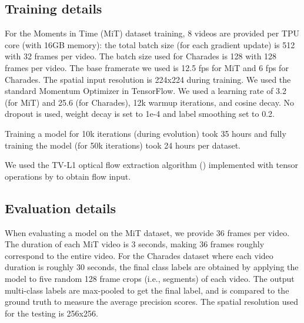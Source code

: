 \documentclass{article} \usepackage{iclr2020_conference,times}
\begin{document}
\subsection{Training details}

For the Moments in Time (MiT) dataset training, 8 videos are provided per TPU core (with 16GB memory): the total batch size (for each gradient update) is 512 with 32 frames per video. The batch size used for Charades is 128 with 128 frames per video. The base framerate we used is 12.5 fps for MiT and 6 fps for Charades. The spatial input resolution is 224x224 during training. We used the standard Momentum Optimizer in TensorFlow. We used a learning rate of 3.2 (for MiT) and 25.6 (for Charades), 12k warmup iterations, and cosine decay. No dropout is used, weight decay is set to 1e-4 and label smoothing set to 0.2. 

Training a model for 10k iterations (during evolution) took 35 hours and fully training the model (for 50k iterations) took 24 hours per dataset.

We used the TV-L1 optical flow extraction algorithm (\citealp{zach2007duality}) implemented with tensor operations by \cite{piergiovanni2018representation} to obtain flow input.


\subsection{Evaluation details}

When evaluating a model on the MiT dataset, we provide 36 frames per video. The duration of each MiT video is 3 seconds, making 36 frames roughly correspond to the entire video. For the Charades dataset where each video duration is roughly 30 seconds, the final class labels are obtained by applying the model to five random 128 frame crops (i.e., segments) of each video. The output multi-class labels are max-pooled to get the final label, and is compared to the ground truth to measure the average precision scores. The spatial resolution used for the testing is 256x256.
\end{document}

